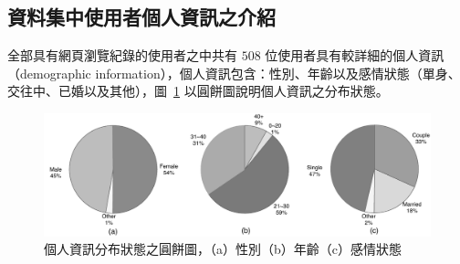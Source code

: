 \subsection{資料集中使用者個人資訊之介紹}
{
全部具有網頁瀏覽紀錄的使用者之中共有 $508$ 位使用者具有較詳細的個人資訊（demographic information），個人資訊包含：性別、年齡以及感情狀態（單身、交往中、已婚以及其他），圖~\ref{fig:dataset_distribution} 以圓餅圖說明個人資訊之分布狀態。

\begin{figure}[h]
    \graphicspath{{fig/}}
    \begin{center}
    \includegraphics[scale=0.65]{fig/demo_pie.pdf}
    \caption{個人資訊分布狀態之圓餅圖，（a）性別（b）年齡（c）感情狀態}
    \label{fig:dataset_distribution}
    \end{center}
\end{figure}

}

